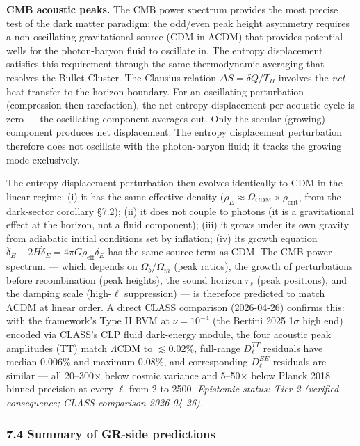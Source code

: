 \documentclass[
]{article}
\begin{document}
\textbf{CMB acoustic peaks.} The CMB power spectrum provides the most
precise test of the dark matter paradigm: the odd/even peak height
asymmetry requires a non-oscillating gravitational source (CDM in ΛCDM)
that provides potential wells for the photon-baryon fluid to oscillate
in. The entropy displacement satisfies this requirement through the same
thermodynamic averaging that resolves the Bullet Cluster. The Clausius
relation \(\Delta S = \delta Q / T_H\) involves the \emph{net} heat
transfer to the horizon boundary. For an oscillating perturbation
(compression then rarefaction), the net entropy displacement per
acoustic cycle is zero --- the oscillating component averages out. Only
the secular (growing) component produces net displacement. The entropy
displacement perturbation therefore does not oscillate with the
photon-baryon fluid; it tracks the growing mode exclusively.

The entropy displacement perturbation then evolves identically to CDM in
the linear regime: (i) it has the same effective density
(\(\rho_E \approx \Omega_{\text{CDM}} \times \rho_{\text{crit}}\), from
the dark-sector corollary §7.2); (ii) it does not couple to photons (it
is a gravitational effect at the horizon, not a fluid component); (iii)
it grows under its own gravity from adiabatic initial conditions set by
inflation; (iv) its growth equation
\(\ddot{\delta}_E + 2H\dot{\delta}_E = 4\pi G \rho_{\text{eff}} \delta_E\)
has the same source term as CDM. The CMB power spectrum --- which
depends on \(\Omega_b/\Omega_m\) (peak ratios), the growth of
perturbations before recombination (peak heights), the sound horizon
\(r_s\) (peak positions), and the damping scale (high-\(\ell\)
suppression) --- is therefore predicted to match ΛCDM at linear order. A
direct CLASS comparison (2026-04-26) confirms this: with the framework's
Type II RVM at \(\nu = 10^{-4}\) (the Bertini 2025 1\(\sigma\) high end)
encoded via CLASS's CLP fluid dark-energy module, the four acoustic peak
amplitudes (TT) match \(\Lambda\)CDM to \(\lesssim 0.02\%\), full-range
\(D_\ell^{TT}\) residuals have median \(0.006\%\) and maximum
\(0.08\%\), and corresponding \(D_\ell^{EE}\) residuals are similar ---
all 20--300\(\times\) below cosmic variance and 5--50\(\times\) below
Planck 2018 binned precision at every \(\ell\) from 2 to 2500.
\emph{Epistemic status: Tier 2 (verified consequence; CLASS comparison
2026-04-26).}

\hypertarget{summary-of-gr-side-predictions}{%
\subsubsection{7.4 Summary of GR-side
predictions}\label{summary-of-gr-side-predictions}}
\end{document}
